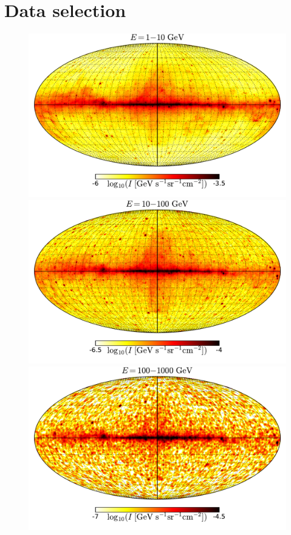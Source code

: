 \section{Data selection}


\begin{figure}[h]
\includegraphics[width=\threepic\textwidth]{plots/Mollweide_data_source_range_0.pdf}
\includegraphics[width=\threepic\textwidth]{plots/Mollweide_data_source_range_1.pdf}
\includegraphics[width=\threepic\textwidth]{plots/Mollweide_data_source_range_2.pdf}

\end{figure}
